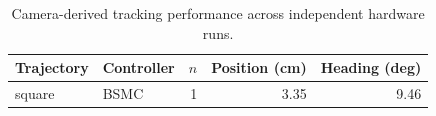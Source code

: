 \begin{table}[!t]
\centering
\caption{Camera-derived tracking performance across independent hardware runs.}
\label{tab:tracking}
\begin{tabular}{llrrr}
\hline
Trajectory & Controller & $n$ & Position (cm) & Heading (deg) \\
\hline
square & BSMC & 1 & 3.35 & 9.46 \\
\hline
\end{tabular}
\end{table}
